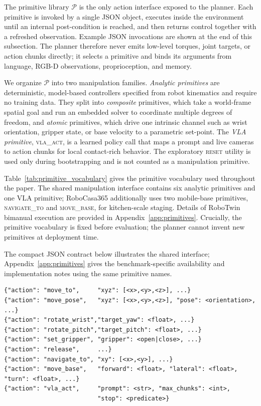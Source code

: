 \documentclass[11pt]{article}
\begin{document}
The primitive library $\mathcal{P}$ is the only action interface exposed to the planner. Each primitive is invoked by a single JSON object, executes inside the environment until an internal post-condition is reached, and then returns control together with a refreshed observation. Example JSON invocations are shown at the end of this subsection. The planner therefore never emits low-level torques, joint targets, or action chunks directly; it selects a primitive and binds its arguments from language, RGB-D observations, proprioception, and memory.

We organize $\mathcal{P}$ into two manipulation families. \emph{Analytic primitives} are deterministic, model-based controllers specified from robot kinematics and require no training data. They split into \emph{composite} primitives, which take a world-frame spatial goal and run an embedded solver to coordinate multiple degrees of freedom, and \emph{atomic} primitives, which drive one intrinsic channel such as wrist orientation, gripper state, or base velocity to a parametric set-point. The \emph{VLA primitive}, \textsc{vla\_act}, is a learned policy call that maps a prompt and live cameras to action chunks for local contact-rich behavior. The exploratory \textsc{reset} utility is used only during bootstrapping and is not counted as a manipulation primitive.

Table~\ref{tab:primitive_vocabulary} gives the primitive vocabulary used throughout the paper. The shared manipulation interface contains six analytic primitives and one VLA primitive; RoboCasa365 additionally uses two mobile-base primitives, \textsc{navigate\_to} and \textsc{move\_base}, for kitchen-scale staging. Details of RoboTwin bimanual execution are provided in Appendix~\ref{app:primitives}. Crucially, the primitive vocabulary is fixed before evaluation; the planner cannot invent new primitives at deployment time.



The compact JSON contract below illustrates the shared interface; Appendix~\ref{app:primitives} gives the benchmark-specific availability and implementation notes using the same primitive names.

\begin{lstlisting}[frame=single,framerule=0.5pt]
{"action": "move_to",     "xyz": [<x>,<y>,<z>], ...}
{"action": "move_pose",   "xyz": [<x>,<y>,<z>], "pose": <orientation>, ...}
{"action": "rotate_wrist","target_yaw": <float>, ...}
{"action": "rotate_pitch","target_pitch": <float>, ...}
{"action": "set_gripper", "gripper": <open|close>, ...}
{"action": "release",     ...}
{"action": "navigate_to", "xy": [<x>,<y>], ...}
{"action": "move_base",   "forward": <float>, "lateral": <float>, "turn": <float>, ...}
{"action": "vla_act",     "prompt": <str>, "max_chunks": <int>,
                          "stop": <predicate>}
\end{lstlisting}
\end{document}
